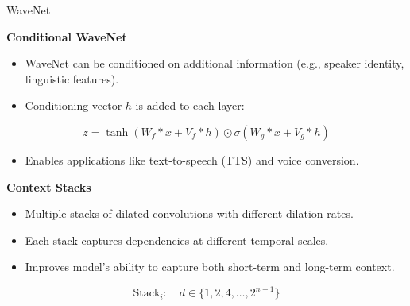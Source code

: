\begin{frame}[allowframebreaks]{WaveNet}
    \framebreak

    \textbf{Conditional WaveNet}

    \begin{itemize}
        \item WaveNet can be conditioned on additional information (e.g., speaker identity, linguistic features).
        \item Conditioning vector $h$ is added to each layer:
    \end{itemize}
    \begin{equation*}
        z = \tanh(W_{f} * x + V_{f} * h) \odot \sigma(W_{g} * x + V_{g} * h)
    \end{equation*}
    \begin{itemize}
        \item Enables applications like text-to-speech (TTS) and voice conversion.
    \end{itemize}

    \framebreak

    \textbf{Context Stacks}

    \begin{itemize}
        \item Multiple stacks of dilated convolutions with different dilation rates.
        \item Each stack captures dependencies at different temporal scales.
        \item Improves model's ability to capture both short-term and long-term context.
    \end{itemize}
    \begin{equation*}
        \text{Stack}_i: \quad d \in \{1, 2, 4, \ldots, 2^{n-1}\}
    \end{equation*}

    \framebreak


\end{frame}
